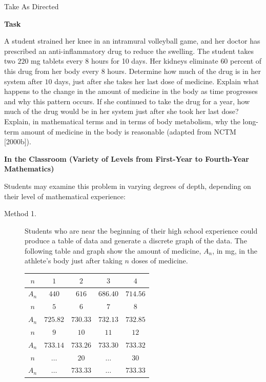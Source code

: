 
\TriExample
  {
    Take As Directed
  }
  {
    \textbf{Task}

    A student strained her knee in an intramural volleyball game, and her doctor has prescribed an anti-inflammatory drug to reduce the swelling. The student takes two $220$ mg tablets every $8$ hours for 10 days. Her kidneys eliminate $60$ percent of this drug from her body every $8$ hours. Determine how much of the drug is in her system after $10$ days, just after she takes her last dose of medicine. Explain what happens to the change in the amount of medicine in the body as time progresses and why this pattern occurs. If she continued to take the drug for a year, how much of the drug would be in her system just after she took her last dose? Explain, in mathematical terms and in terms of body metabolism, why the long-term amount of medicine in the body is reasonable (adapted from NCTM [2000b]).

    \textbf{In the Classroom (Variety of Levels from First-Year to Fourth-Year Mathematics)}

    Students may examine this problem in varying degrees of depth, depending on their level of mathematical experience:

    \begin{description}
      \item[Method 1.] Students who are near the beginning of their high school experience could produce a table of data and generate a discrete graph of the data. The following table and graph show the amount of medicine, $A_n$, in mg, in the athlete's body just after taking $n$ doses of medicine.

      \begin{center}
      \setlength{\tabcolsep}{5pt}
      \begin{tabular}{|c|c|c|c|c|}
      \hline
      $n$   & $1$      & $2$      & $3$      & $4$      \\
      \hline
      $A_n$ & $440$    & $616$    & $686.40$ & $714.56$ \\
      \hline
      $n$   & $5$      & $6$      & $7$      & $8$      \\
      \hline
      $A_n$ & $725.82$ & $730.33$ & $732.13$ & $732.85$ \\
      \hline
      $n$   & $9$      & $10$     & $11$     & $12$     \\
      \hline
      $A_n$ & $733.14$ & $733.26$ & $733.30$ & $733.32$ \\
      \hline
      $n$   & $\dots$  & $20$     & $\dots$  & $30$     \\
      \hline
      $A_n$ & $\dots$  & $733.33$ & $\dots$  & $733.33$ \\
      \hline
      \end{tabular}
      \end{center}


\end{description}}
